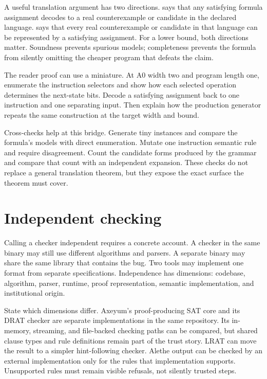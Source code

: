A useful translation argument has two directions.  says that any satisfying formula assignment decodes to a real
counterexample or candidate in the declared language.  says that every real counterexample or candidate in that
language can be represented by a satisfying assignment. For a lower bound,
both directions matter. Soundness prevents spurious models; completeness
prevents the formula from silently omitting the cheaper program that defeats
the claim.

The reader proof can use a miniature. At A0 width two and program length one,
enumerate the instruction selectors and show how each selected operation
determines the next-state bits. Decode a satisfying assignment back to one
instruction and one separating input. Then explain how the production
generator repeats the same construction at the target width and bound.

Cross-checks help at this bridge. Generate tiny instances and compare the
formula's models with direct enumeration. Mutate one instruction semantic rule
and require disagreement. Count the candidate forms produced by the grammar
and compare that count with an independent expansion. These checks do not
replace a general translation theorem, but they expose the exact surface the
theorem must cover.

\section{Independent checking}

Calling a checker independent requires a concrete account. A checker in the
same binary may still use different algorithms and parsers. A separate binary
may share the same library that contains the bug. Two tools may implement one
format from separate specifications. Independence has dimensions: codebase,
algorithm, parser, runtime, proof representation, semantic implementation,
and institutional origin.

State which dimensions differ. Axeyum's proof-producing SAT core and its DRAT
checker are separate implementations in the same repository. Its in-memory,
streaming, and file-backed checking paths can be compared, but shared clause
types and rule definitions remain part of the trust story. LRAT can move the
result to a simpler hint-following checker. Alethe output can be checked by an
external implementation only for the rules that implementation supports.
Unsupported rules must remain visible refusals, not silently trusted steps.

